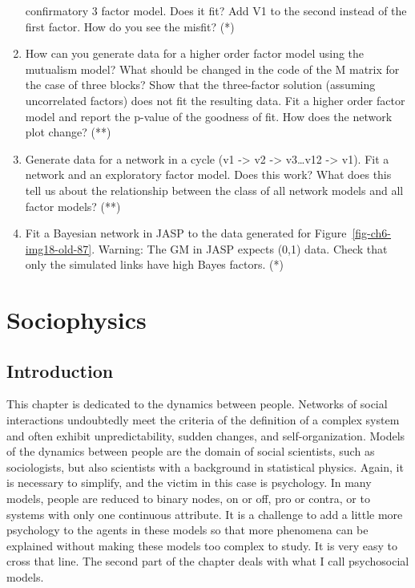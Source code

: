 \documentclass[
  a4paper,
  DIV=11,
  numbers=noendperiod,
  oneside]{scrreprt}
\begin{document}
\begin{enumerate}
  confirmatory 3 factor model. Does it fit? Add V1 to the second instead
  of the first factor. How do you see the misfit? (*)
\item
  How can you generate data for a higher order factor model using the
  mutualism model? What should be changed in the code of the M matrix
  for the case of three blocks? Show that the three-factor solution
  (assuming uncorrelated factors) does not fit the resulting data. Fit a
  higher order factor model and report the p-value of the goodness of
  fit. How does the network plot change? (**)
\item
  Generate data for a network in a cycle (v1 -\textgreater{} v2
  -\textgreater{} v3\ldots v12 -\textgreater{} v1). Fit a network and an
  exploratory factor model. Does this work? What does this tell us about
  the relationship between the class of all network models and all
  factor models? (**)
\item
  Fit a Bayesian network in JASP to the data generated for
  Figure~\ref{fig-ch6-img18-old-87}. Warning: The GM in JASP expects
  (0,1) data. Check that only the simulated links have high Bayes
  factors. (*)
\end{enumerate}


\hypertarget{sec-ch7}{%
\chapter{Sociophysics}\label{sec-ch7}}

\hypertarget{sec-Introduction}{%
\section{Introduction}\label{sec-Introduction}}

This chapter is dedicated to the dynamics between people. Networks of
social interactions undoubtedly meet the criteria of the definition of a
complex system and often exhibit unpredictability, sudden changes, and
self-organization. Models of the dynamics between people are the domain
of social scientists, such as sociologists, but also scientists with a
background in statistical physics. Again, it is necessary to simplify,
and the victim in this case is psychology. In many models, people are
reduced to binary nodes, on or off, pro or contra, or to systems with
only one continuous attribute. It is a challenge to add a little more
psychology to the agents in these models so that more phenomena can be
explained without making these models too complex to study. It is very
easy to cross that line. The second part of the chapter deals with what
I call psychosocial models.
\end{document}
